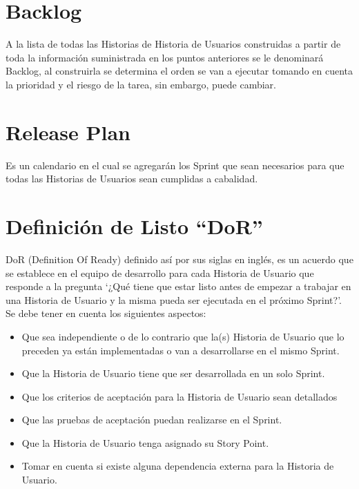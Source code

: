 \section*{Backlog}

A la lista de todas las Historias de Historia de Usuarios construidas a partir de toda la información suministrada en los puntos anteriores se le denominará Backlog, al construirla  se determina el orden se van a ejecutar tomando en cuenta la prioridad y el riesgo de la tarea, sin embargo, puede cambiar. 

\section*{Release Plan}

Es un calendario en el cual se agregarán los Sprint que sean necesarios para que todas las Historias de Usuarios sean cumplidas a cabalidad.

\section*{Definición de Listo “DoR”}

DoR (Definition Of Ready) definido así por sus siglas en inglés, es un acuerdo que se establece
en el equipo de desarrollo para cada Historia de Usuario que responde a la pregunta ‘¿Qué tiene que estar listo antes de empezar a trabajar en una Historia de Usuario y la misma pueda ser ejecutada en el próximo Sprint?’.\\

Se debe tener en cuenta los siguientes aspectos: 

\begin{itemize}
    \item Que sea independiente o de lo contrario que la(s) Historia de Usuario que lo preceden ya están implementadas o van a desarrollarse en el mismo Sprint.
    \item Que la Historia de Usuario tiene que ser desarrollada en un solo Sprint.
    \item Que los criterios de aceptación para la Historia de Usuario sean detallados
    \item Que las pruebas de aceptación puedan realizarse en el Sprint.
    \item Que la Historia de Usuario tenga asignado su Story Point.
    \item Tomar en cuenta si existe alguna dependencia externa para la Historia de Usuario.
\end{itemize}

